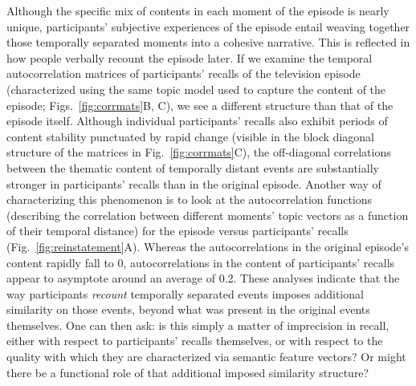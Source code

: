 \documentclass{article}
\begin{document}
Although the specific mix of contents in each moment of the episode is nearly unique, participants' subjective experiences of the episode entail weaving together those temporally separated moments into a cohesive narrative.  This is reflected in how people verbally recount the episode later.  If we examine the temporal autocorrelation matrices of participants' recalls of the television episode (characterized using the same topic model used to capture the content of the episode; Figs.~\ref{fig:corrmats}B, C), we see a different structure than that of the episode itself.  Although individual participants' recalls also exhibit periods of content stability punctuated by rapid change (visible in the block diagonal structure of the matrices in Fig.~\ref{fig:corrmats}C), the off-diagonal correlations between the thematic content of temporally distant events are substantially stronger in participants' recalls than in the original episode.  Another way of characterizing this phenomenon is to look at the autocorrelation functions (describing the correlation between different moments' topic vectors as a function of their temporal distance) for the episode versus participants' recalls (Fig.~\ref{fig:reinstatement}A).  Whereas the autocorrelations in the original episode's content rapidly fall to 0, autocorrelations in the content of participants' recalls appear to asymptote around an average of 0.2.  These analyses indicate that the way participants \textit{recount} temporally separated events imposes additional similarity on those events, beyond what was present in the original events themselves.  One can then ask: is this simply a matter of imprecision in recall, either with respect to participants' recalls themselves, or with respect to the quality with which they are characterized via semantic feature vectors?  Or might there be a functional role of that additional imposed similarity structure?
\end{document}
